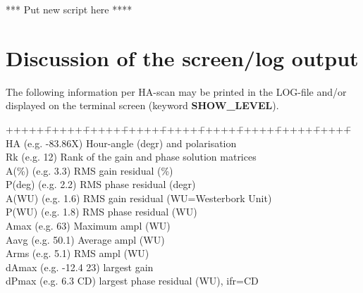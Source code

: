 *** Put new script here ****  


\newpage  
\section{Discussion of the screen/log output}  
\label{.log.output}  

The following information per HA-scan may be printed in the LOG-file and/or
displayed on the terminal screen (keyword {\bf SHOW\_LEVEL}).  

\sskip  
{}  
\setc  

\vspace*{-10mm}  
\begin{tabbing} +++++\=+++++\=+++++\=+++++\=+++++\=+++++\=+++++\=+++++\=+++++\=
\kill %
\\ \> HA        \> (e.g. -83.86X) \>\> Hour-angle (degr) and polarisation  
\\ \> Rk        \> (e.g. 12)    \>\> Rank of the gain and phase solution
matrices  
\\ \> A(\%)     \> (e.g. 3.3)   \>\> RMS gain residual (\%)  
\\ \> P(deg)    \> (e.g. 2.2)   \>\> RMS phase residual (degr)  
\\ \> A(WU)     \> (e.g. 1.6)   \>\> RMS gain residual (WU=Westerbork Unit)  
\\ \> P(WU)     \> (e.g. 1.8)   \>\> RMS phase residual (WU)  
\\ \> Amax      \> (e.g. 63)    \>\> Maximum ampl (WU)  
\\ \> Aavg      \> (e.g. 50.1)  \>\> Average ampl (WU)  
\\ \> Arms      \> (e.g. 5.1)   \>\> RMS ampl (WU)  
\\ \> dAmax     \> (e.g. -12.4 23) \>\> largest gain  
\\ \> dPmax     \> (e.g. 6.3 CD) \>\> largest phase residual (WU), ifr=CD  
\end{tabbing}  


\sskip  
{}  
\sskip  

